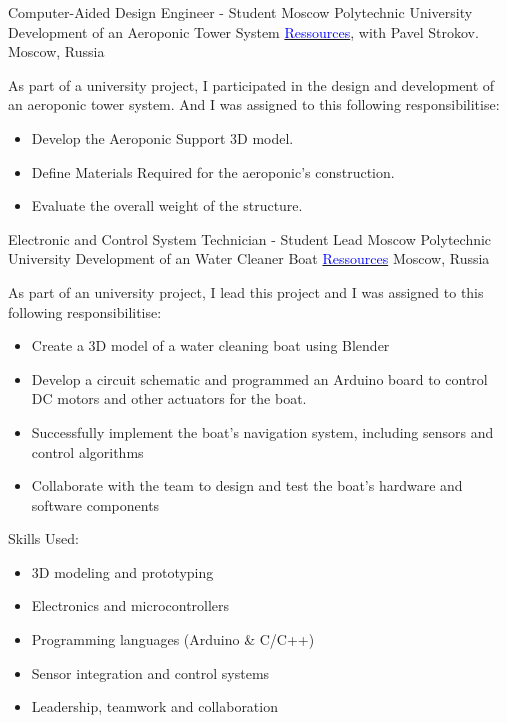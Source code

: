 \vspace{2mm}

    {Computer-Aided Design Engineer - Student}
    {Moscow Polytechnic University}
    {
    \newline
    Development of an Aeroponic Tower System
    \href{https://drive.google.com/drive/folders/1GYReOb4vYT3_jlym9ULB7Yud_lAxtPxk}{\textcolor{blue}{Ressources}}, with Pavel Strokov.
    }
    {Moscow, Russia}
    {
    As part of a university project, I participated in the design and development of an aeroponic tower system. And I was assigned to this following responsibilitise:
    \begin{itemize}
        \item Develop the Aeroponic Support 3D model.
        \item Define Materials Required for the aeroponic's construction.
        \item Evaluate the overall weight of the structure.
    \end{itemize}
    }

\vspace{1mm}

    {Electronic and Control System Technician - Student Lead}
    {Moscow Polytechnic University}
    {
    \newline
    Development of an Water Cleaner Boat
    \href{https://github.com/DanGlChris/Water-cleaning-boat}{\textcolor{blue}{Ressources}}}
    {Moscow, Russia}
    {
    As part of an university project, I lead this project and I was assigned to this following responsibilitise:
    \vspace{1mm}
    \begin{itemize}
        \item Create a 3D model of a water cleaning boat using Blender
        \item Develop a circuit schematic and programmed an Arduino board to control DC motors and other actuators for the boat.
        \item Successfully implement the boat's navigation system, including sensors and control algorithms
        \item Collaborate with the team to design and test the boat's hardware and software components
    \end{itemize}
    \vspace{1mm}
    Skills Used:
    \begin{itemize}
        \item 3D modeling and prototyping
        \item Electronics and microcontrollers
        \item Programming languages (Arduino \& C/C++)
        \item Sensor integration and control systems
        \item Leadership, teamwork and collaboration
    \end{itemize}
    }
\newpage
